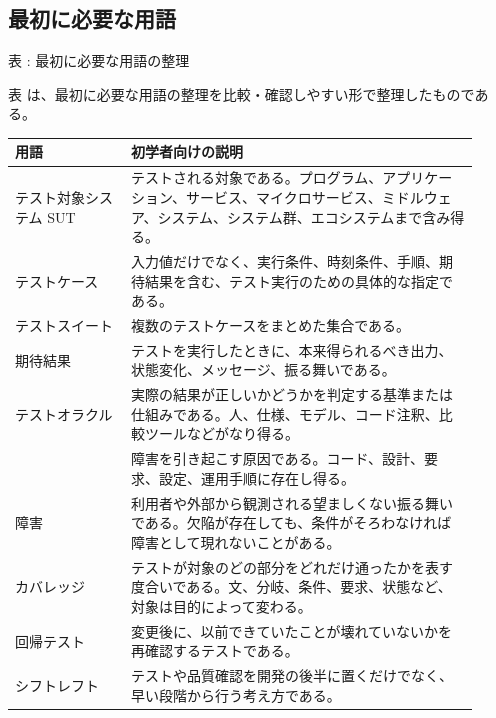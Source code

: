 \subsection*{最初に必要な用語}
\par\smallskip\noindent{}\label{tab:ch05-01}表 \thetable: 最初に必要な用語の整理\par\smallskip
表 \thetable は、最初に必要な用語の整理を比較・確認しやすい形で整理したものである。\par\smallskip
\begin{longtable}{P{0.23\linewidth}P{0.69\linewidth}}
\toprule
用語 & 初学者向けの説明 \\
\midrule
テスト対象システム SUT & テストされる対象である。プログラム、アプリケーション、サービス、マイクロサービス、ミドルウェア、システム、システム群、エコシステムまで含み得る。\\
テストケース & 入力値だけでなく、実行条件、時刻条件、手順、期待結果を含む、テスト実行のための具体的な指定である。\\
テストスイート & 複数のテストケースをまとめた集合である。\\
期待結果 & テストを実行したときに、本来得られるべき出力、状態変化、メッセージ、振る舞いである。\\
テストオラクル & 実際の結果が正しいかどうかを判定する基準または仕組みである。人、仕様、モデル、コード注釈、比較ツールなどがなり得る。\\
 & 障害を引き起こす原因である。コード、設計、要求、設定、運用手順に存在し得る。\\
障害 & 利用者や外部から観測される望ましくない振る舞いである。欠陥が存在しても、条件がそろわなければ障害として現れないことがある。\\
カバレッジ & テストが対象のどの部分をどれだけ通ったかを表す度合いである。文、分岐、条件、要求、状態など、対象は目的によって変わる。\\
回帰テスト & 変更後に、以前できていたことが壊れていないかを再確認するテストである。\\
シフトレフト & テストや品質確認を開発の後半に置くだけでなく、早い段階から行う考え方である。\\
\bottomrule
\end{longtable}
